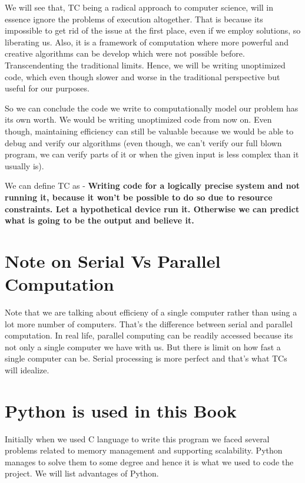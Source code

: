 \documentclass{book}
\begin{document}
We will see that, TC being a radical approach to computer science, will in essence ignore the problems of execution altogether. That is because its impossible to get rid of the issue at the first place, even if we employ solutions, so liberating us. Also, it is a framework of computation where more powerful and creative algorithms can be develop which were not possible before. Transcendenting the traditional limits. Hence, we will be writing unoptimized code, which even though slower and worse in the traditional perspective but useful for our purposes.

So we can conclude the code we write to computationally model our problem has its own worth. We would be writing unoptimized code from now on. Even though, maintaining efficiency can still be valuable because we would be able to debug and verify our algorithms (even though, we can't verify our full blown program, we can verify parts of it or when the given input is less complex than it usually is). 

We can define TC as -
\textbf{Writing code for a logically precise system and not running it, because it won't be possible to do so due to resource constraints. Let a hypothetical device run it. Otherwise we can predict what is going to be the output and believe it.}

\section{Note on Serial Vs Parallel Computation}

Note that we are talking about efficieny of a single computer rather than using a lot more number of computers. That's the difference between serial and parallel computation. In real life, parallel computing can be readily accessed because its not only a single computer we have with us. But there is limit on how fast a single computer can be. Serial processing is more perfect and that's what TCs will idealize.

\section{Python is used in this Book}

Initially when we used C language to write this program we faced several problems related to memory management and supporting scalability. Python manages to solve them to some degree and hence it is what we used to code the project. We will list advantages of Python.
\end{document}
